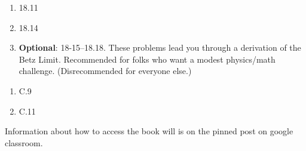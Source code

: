 \documentclass[12pt]{article}
\begin{document}
\begin{enumerate}
\setlength{\itemsep}{-1mm}
\item 18.11
\item 18.14
\item {\bf Optional}: 18-15--18.18. These problems lead you through a
  derivation of the Betz Limit. Recommended for folks who want a
  modest physics/math challenge. (Disrecommended for everyone
  else.)
    \end{enumerate}


\begin{enumerate}
  \setlength{\itemsep}{-1mm}
\item C.9
\item C.11\\ 
\end{enumerate}


\noindent Information about how to access the book will is on the
pinned post on google classroom. 
\end{document}
